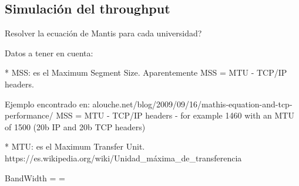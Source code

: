 \subsection{Simulación del throughput}

Resolver la ecuación de Mantis para cada universidad?

Datos a tener en cuenta:

* MSS: es el Maximum Segment Size. 
Aparentemente MSS = MTU - TCP/IP headers.

Ejemplo encontrado en: alouche.net/blog/2009/09/16/mathis-equation-and-tcp-performance/
MSS = MTU - TCP/IP headers - for example 1460 with an MTU of 1500 (20b IP and 20b TCP headers)

* MTU: es el Maximum Transfer Unit.
https://es.wikipedia.org/wiki/Unidad_máxima_de_transferencia

\begin{center}
BandWidth =  = 
\end{center}
